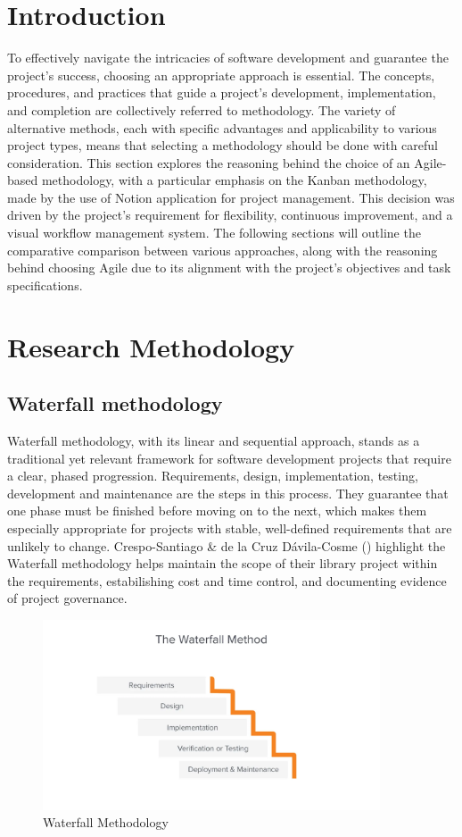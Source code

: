 \section{Introduction}
To effectively navigate the intricacies of software development and guarantee the project's success, choosing an appropriate approach is essential.
The concepts, procedures, and practices that guide a project's development, implementation, and completion are collectively referred to methodology.
The variety of alternative methods, each with specific advantages and applicability to various project types, means that selecting a methodology should be done with careful consideration.
This section explores the reasoning behind the choice of an Agile-based methodology, with a particular emphasis on the Kanban methodology, made by the use of Notion application for project management.
This decision was driven by the project's requirement for flexibility, continuous improvement, and a visual workflow management system. 
The following sections will outline the comparative comparison between various approaches, along with the reasoning behind choosing Agile due to its alignment with the project's objectives and task specifications.
\\
\section{Research Methodology}
\subsection{Waterfall methodology}
Waterfall methodology, with its linear and sequential approach, stands as a traditional yet relevant framework for software development projects that require a clear, phased progression.
Requirements, design, implementation, testing, development and maintenance are the steps in this process.
They guarantee that one phase must be finished before moving on to the next, which makes them especially appropriate for projects with stable, well-defined requirements that are unlikely to change.
Crespo-Santiago \& de la Cruz Dávila-Cosme (\citeyear{cresposantiago_2022_waterfall}) highlight the Waterfall methodology helps maintain the scope of their library project within the requirements, estabilishing cost and time control, and documenting evidence of project governance.
\begin{figure}[H]
    \centering
    \includegraphics[width=10cm]{Images/watefall.png}
    \caption{Waterfall Methodology \citep{communitcationteam_2022_waterfall}}
    \label{fig:waterfall}
\end{figure}

